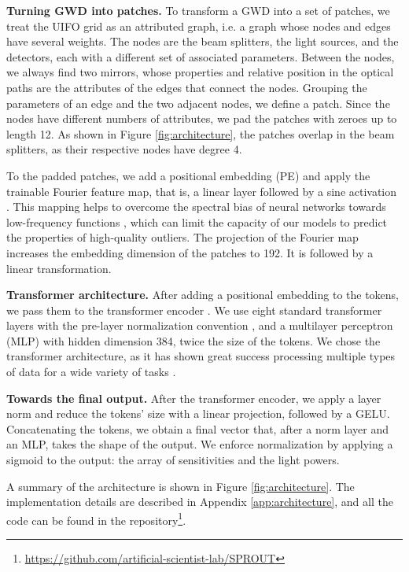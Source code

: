 \documentclass[a4paper,twocolumn,11pt,unpublished]{quantumarticle}
\begin{document}
\textbf{Turning GWD into patches.} To transform a GWD into a set of patches, we treat the UIFO grid as an attributed graph, i.e. a graph whose nodes and edges have several weights. The nodes are the beam splitters, the light sources, and the detectors, each with a different set of associated parameters. Between the nodes, we always find two mirrors, whose properties and relative position in the optical paths are the attributes of the edges that connect the nodes. Grouping the parameters of an edge and the two adjacent nodes, we define a patch. Since the nodes have different numbers of attributes, we pad the patches with zeroes up to length 12. As shown in Figure \ref{fig:architecture}, the patches overlap in the beam splitters, as their respective nodes have degree 4.

To the padded patches, we add a positional embedding (PE) and apply the trainable Fourier feature map, that is, a linear layer followed by a sine activation \cite{fourierfeatures}. This mapping helps to overcome the spectral bias of neural networks towards low-frequency functions \cite{spectralbias,frequencybias}, which can limit the capacity of our models to predict the properties of high-quality outliers. The projection of the Fourier map increases the embedding dimension of the patches to 192. It is followed by a linear transformation.

\textbf{Transformer architecture.} After adding a positional embedding to the tokens, we pass them to the transformer encoder \cite{transformers}. We use eight standard transformer layers with the pre-layer normalization convention \cite{layernorm}, and a multilayer perceptron (MLP) with hidden dimension 384, twice the size of the tokens. We chose the transformer architecture, as it has shown great success processing multiple types of data for a wide variety of tasks \cite{lee2019set, devlin2019bert, schwaller2019molecular, alphafold, zhou2021informer, chen2021decision, janner2021offline, liu2021Swin, han2022survey}. %

\textbf{Towards the final output.} After the transformer encoder, we apply a layer norm and reduce the tokens' size with a linear projection, followed by a GELU. Concatenating the tokens, we obtain a final vector that, after a norm layer and an MLP, takes the shape of the output. We enforce normalization by applying a sigmoid to the output: the array of sensitivities and the light powers.

A summary of the architecture is shown in Figure \ref{fig:architecture}. The implementation details are described in Appendix \ref{app:architecture}, and all the code can be found in the repository\footnote{\href{https://github.com/artificial-scientist-lab/SPROUT}{https://github.com/artificial-scientist-lab/SPROUT}}.
\end{document}
